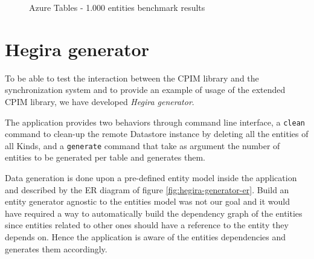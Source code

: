 \begin{figure}[tbh]
  \centering
  \qquad
  \caption{Azure Tables - 1.000 entities benchmark results}
  \label{fig:azure-1000}
\end{figure} 

\section{Hegira generator}
\label{sec:data}
To be able to test the interaction between the CPIM library and the synchronization system and to provide an example of usage of the extended CPIM library, we have developed \textit{Hegira generator}.

\noindent The application provides two behaviors through command line interface, a \texttt{clean} command to clean-up the remote Datastore instance by deleting all the entities of all Kinds, and a \texttt{generate} command that take as argument the number of entities to be generated per table and generates them.

\newparagraph Data generation is done upon a pre-defined entity model inside the application and described by the ER diagram of figure \ref{fig:hegira-generator-er}.
Build an entity generator agnostic to the entities model was not our goal and it would have required a way to automatically build the dependency graph of the entities since entities related to other ones should have a reference to the entity they depends on. Hence the application is aware of the entities dependencies and generates them accordingly.

